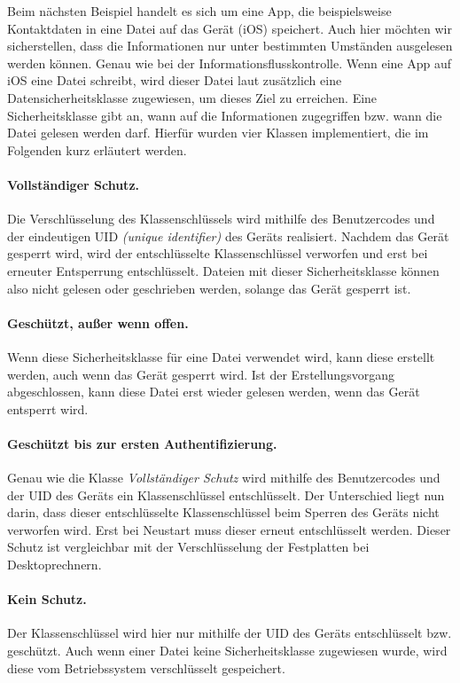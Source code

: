 Beim nächsten Beispiel handelt es sich um eine App, die beispielsweise
Kontaktdaten in eine Datei auf das Gerät (iOS) speichert. Auch hier möchten wir
sicherstellen, dass die Informationen nur unter bestimmten Umständen ausgelesen
werden können.  Genau wie bei der Informationsflusskontrolle. Wenn eine App auf
iOS eine Datei schreibt, wird dieser Datei laut \cite{appledev,apple2020}
zusätzlich eine Datensicherheitsklasse zugewiesen, um dieses Ziel zu erreichen.
Eine Sicherheitsklasse gibt an, wann auf die Informationen zugegriffen bzw.
wann die Datei gelesen werden darf. Hierfür wurden vier Klassen implementiert,
die im Folgenden kurz erläutert werden.

\paragraph{Vollständiger Schutz.}{Die Verschlüsselung des Klassenschlüssels wird
mithilfe des Benutzercodes und der eindeutigen UID \textit{(unique identifier)}
des Geräts realisiert. Nachdem das Gerät gesperrt wird, wird der entschlüsselte
Klassenschlüssel verworfen und erst bei erneuter Entsperrung entschlüsselt.
Dateien mit dieser Sicherheitsklasse können also nicht gelesen oder geschrieben
werden, solange das Gerät gesperrt ist.}

\paragraph{Geschützt, außer wenn offen.}{Wenn diese Sicherheitsklasse für eine
Datei verwendet wird, kann diese erstellt werden, auch wenn das Gerät gesperrt
wird. Ist der Erstellungsvorgang abgeschlossen, kann diese Datei erst wieder
gelesen werden, wenn das Gerät entsperrt wird.}

\paragraph{Geschützt bis zur ersten Authentifizierung.}{Genau wie die Klasse
\textit{Vollständiger Schutz} wird mithilfe des Benutzercodes und der UID des
Geräts ein Klassenschlüssel entschlüsselt. Der Unterschied liegt nun darin, dass
dieser entschlüsselte Klassenschlüssel beim Sperren des Geräts nicht verworfen
wird. Erst bei Neustart muss dieser erneut entschlüsselt werden. Dieser Schutz
ist vergleichbar mit der Verschlüsselung der Festplatten bei Desktoprechnern.}

\paragraph{Kein Schutz.}{Der Klassenschlüssel wird hier nur mithilfe der UID des
Geräts entschlüsselt bzw. geschützt. Auch wenn einer Datei keine
Sicherheitsklasse zugewiesen wurde, wird diese vom Betriebssystem verschlüsselt
gespeichert.}

